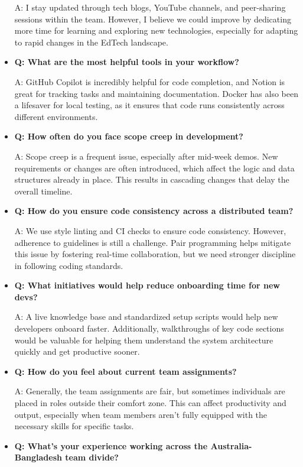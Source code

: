 \documentclass[12pt,a4paper,oneside]{book}
\begin{document}
\begin{itemize}
A: I stay updated through tech blogs, YouTube channels, and peer-sharing sessions within the team. However, I believe we could improve by dedicating more time for learning and exploring new technologies, especially for adapting to rapid changes in the EdTech landscape.

\item \textbf{Q: What are the most helpful tools in your workflow?} 

A: GitHub Copilot is incredibly helpful for code completion, and Notion is great for tracking tasks and maintaining documentation. Docker has also been a lifesaver for local testing, as it ensures that code runs consistently across different environments.

\item \textbf{Q: How often do you face scope creep in development?} 

A: Scope creep is a frequent issue, especially after mid-week demos. New requirements or changes are often introduced, which affect the logic and data structures already in place. This results in cascading changes that delay the overall timeline.

\item \textbf{Q: How do you ensure code consistency across a distributed team?} 

A: We use style linting and CI checks to ensure code consistency. However, adherence to guidelines is still a challenge. Pair programming helps mitigate this issue by fostering real-time collaboration, but we need stronger discipline in following coding standards.

\item \textbf{Q: What initiatives would help reduce onboarding time for new devs?}

A: A live knowledge base and standardized setup scripts would help new developers onboard faster. Additionally, walkthroughs of key code sections would be valuable for helping them understand the system architecture quickly and get productive sooner.

\item \textbf{Q: How do you feel about current team assignments?} 

A: Generally, the team assignments are fair, but sometimes individuals are placed in roles outside their comfort zone. This can affect productivity and output, especially when team members aren’t fully equipped with the necessary skills for specific tasks.

\item \textbf{Q: What’s your experience working across the Australia-Bangladesh team divide?} 


\end{itemize}
\end{document}
